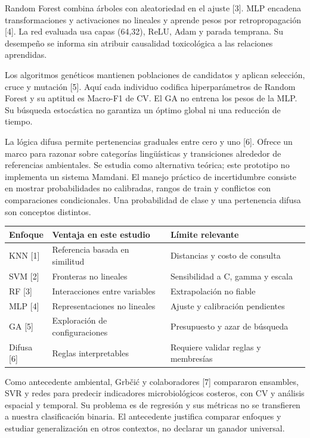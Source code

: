 \documentclass[12pt,a4paper]{article}
\begin{document}
Random Forest combina árboles con aleatoriedad en el ajuste [3]. MLP encadena transformaciones y activaciones no lineales y aprende pesos por retropropagación [4]. La red evaluada usa capas (64,32), ReLU, Adam y parada temprana. Su desempeño se informa sin atribuir causalidad toxicológica a las relaciones aprendidas.

Los algoritmos genéticos mantienen poblaciones de candidatos y aplican selección, cruce y mutación [5]. Aquí cada individuo codifica hiperparámetros de Random Forest y su aptitud es Macro-F1 de CV. El GA no entrena los pesos de la MLP. Su búsqueda estocástica no garantiza un óptimo global ni una reducción de tiempo.

La lógica difusa permite pertenencias graduales entre cero y uno [6]. Ofrece un marco para razonar sobre categorías lingüísticas y transiciones alrededor de referencias ambientales. Se estudia como alternativa teórica; este prototipo no implementa un sistema Mamdani. El manejo práctico de incertidumbre consiste en mostrar probabilidades no calibradas, rangos de train y conflictos con comparaciones condicionales. Una probabilidad de clase y una pertenencia difusa son conceptos distintos.

{\small\begin{tabularx}{\textwidth}{XXX}
\toprule
Enfoque & Ventaja en este estudio & Límite relevante \\
\midrule
KNN [1] & Referencia basada en similitud & Distancias y costo de consulta \\
SVM [2] & Fronteras no lineales & Sensibilidad a C, gamma y escala \\
RF [3] & Interacciones entre variables & Extrapolación no fiable \\
MLP [4] & Representaciones no lineales & Ajuste y calibración pendientes \\
GA [5] & Exploración de configuraciones & Presupuesto y azar de búsqueda \\
Difusa [6] & Reglas interpretables & Requiere validar reglas y membresías \\
\bottomrule\end{tabularx}}

Como antecedente ambiental, Grb\v{c}i\'{c} y colaboradores [7] compararon ensambles, SVR y redes para predecir indicadores microbiológicos costeros, con CV y análisis espacial y temporal. Su problema es de regresión y sus métricas no se transfieren a nuestra clasificación binaria. El antecedente justifica comparar enfoques y estudiar generalización en otros contextos, no declarar un ganador universal.
\end{document}
